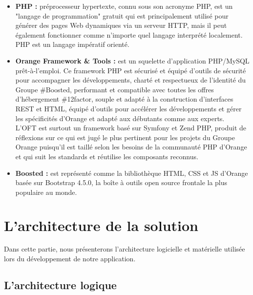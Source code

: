 \begin{itemize}
	\item \textbf{PHP \cite{php} :} préprocesseur hypertexte, connu sous son acronyme PHP, est un "langage de programmation" gratuit qui est principalement utilisé pour générer des pages Web dynamiques via un serveur HTTP, mais il peut également fonctionner comme n'importe quel langage interprété localement. PHP est un langage impératif orienté.
	
	\item \textbf{Orange Framework \& Tools \cite{oft} :} est un squelette d'application PHP/MySQL prêt-à-l'emploi. Ce framework PHP est sécurisé et équipé d'outils de sécurité pour accompagner les développements, charté et respectueux de l'identité du Groupe \#Boosted, performant et compatible avec toutes les offres d'hébergement \#12factor, souple et adapté à la construction d'interfaces REST et HTML, équipé d'outils pour accélérer les développements et gérer les spécificités d'Orange et adapté aux débutants comme aux experts.\\
	L'OFT est surtout un framework basé sur Symfony et Zend PHP, produit de réflexions sur ce qui est jugé le plus pertinent pour les projets du Groupe Orange puisqu'il est taillé selon les besoins de la communauté PHP d'Orange et qui suit les standards et réutilise les composants reconnus.
	
	\item \textbf{Boosted \cite{boosted} :} est représenté comme la bibliothèque HTML, CSS et JS d'Orange basée sur Bootstrap 4.5.0, la boîte à outils open source frontale la plus populaire au monde.
	
\end{itemize}

\section[L'architecture de la solution]{L'architecture de la solution}
Dans cette partie, nous présenterons l'architecture logicielle et matérielle utilisée lors du développement de notre application.
\subsection[L'architecture logique]{L'architecture logique}

